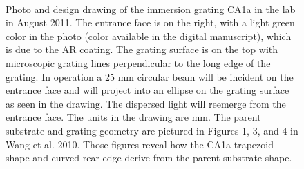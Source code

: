 \begin{figure}
  \centering
	~
  \caption[Photo and design drawing of the IGRINS immersion grating]{Photo and design drawing of the immersion grating CA1a in the lab in August 2011.  The entrance face is on the right, with a light green color in the photo (color available in the digital manuscript), which is due to the AR coating.  The grating surface is on the top with microscopic grating lines perpendicular to the long edge of the grating.  In operation a 25 mm circular beam will be incident on the entrance face and will project into an ellipse on the grating surface as seen in the drawing.  The dispersed light will reemerge from the entrance face.  The units in the drawing are mm.  The parent substrate and grating geometry are pictured in Figures 1, 3, and 4 in Wang et al. 2010\cite{2010SPIE.7739E.146W}.  Those figures reveal how the CA1a trapezoid shape and curved rear edge derive from the parent substrate shape.}
  \label{fig:gram}
\end{figure}

